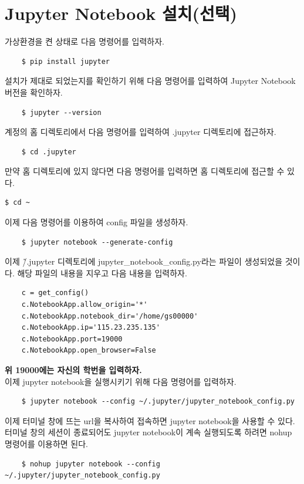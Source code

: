 \section{Jupyter Notebook 설치(선택)}
가상환경을 켠 상태로 다음 명령어를 입력하자.
\begin{lstlisting}
    $ pip install jupyter
\end{lstlisting}
설치가 제대로 되었는지를 확인하기 위해 다음 명령어를 입력하여 Jupyter Notebook 버전을 확인하자.
\begin{lstlisting}
    $ jupyter --version
\end{lstlisting}
계정의 홈 디렉토리에서 다음 명령어를 입력하여 .jupyter 디렉토리에 접근하자.
\begin{lstlisting}
    $ cd .jupyter
\end{lstlisting}
만약 홈 디렉토리에 있지 않다면 다음 명령어를 입력하면 홈 디렉토리에 접근할 수 있다.
\begin{lstlisting}[language=bash]
    $ cd ~
\end{lstlisting}
이제 다음 명령어를 이용하여 config 파일을 생성하자.
\begin{lstlisting}
    $ jupyter notebook --generate-config
\end{lstlisting}
이제 \~/.jupyter 디렉토리에 jupyter\_notebook\_config.py라는 파일이 생성되었을 것이다. 해당 파일의 내용을 지우고 다음 내용을 입력하자.
\begin{lstlisting}
    c = get_config()
    c.NotebookApp.allow_origin='*'
    c.NotebookApp.notebook_dir='/home/gs00000'
    c.NotebookApp.ip='115.23.235.135'
    c.NotebookApp.port=19000
    c.NotebookApp.open_browser=False
\end{lstlisting}
    \textbf{위 19000에는 자신의 학번을 입력하자.}\\
이제 jupyter notebook을 실행시키기 위해 다음 명령어를 입력하자.
\begin{lstlisting}
    $ jupyter notebook --config ~/.jupyter/jupyter_notebook_config.py
\end{lstlisting}
이제 터미널 창에 뜨는 url을 복사하여 접속하면 jupyter notebook을 사용할 수 있다.\\
터미널 창의 세션이 종료되어도 jupyter notebook이 계속 실행되도록 하려면 nohup 명령어를 이용하면 된다.
\begin{lstlisting}
    $ nohup jupyter notebook --config ~/.jupyter/jupyter_notebook_config.py
\end{lstlisting}